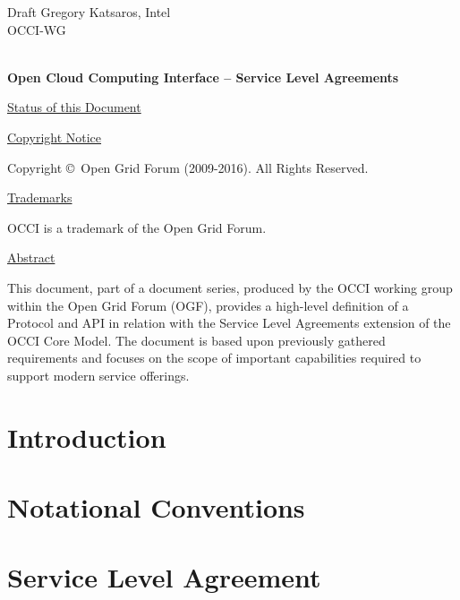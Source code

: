 \documentclass[10pt,a4paper]{article}
\begin{document}
\thispagestyle{empty}

Draft \hfill  Gregory Katsaros, Intel\\
OCCI-WG \hfill  \\
\rightline {\today}\\

\vspace*{0.5in}

\begin{Large}
\textbf{Open Cloud Computing Interface -- Service Level Agreements}
\end{Large}

\vspace*{0.5in}

\underline{Status of this Document}



\underline{Copyright Notice}

Copyright \copyright ~Open Grid Forum (2009-2016). All Rights
Reserved.

\underline{Trademarks}

OCCI is a trademark of the Open Grid Forum.

\underline{Abstract}



This document, part of a document series, produced by the OCCI working group within the Open Grid Forum (OGF), provides a high-level definition of a Protocol and API in relation with the Service Level Agreements extension of the OCCI Core Model. The document is based upon previously gathered requirements and focuses on the scope of important capabilities required to support modern service offerings.

\newpage
\tableofcontents
\newpage

\section{Introduction}



\section{Notational Conventions}



\section{Service Level Agreement}
\end{document}
